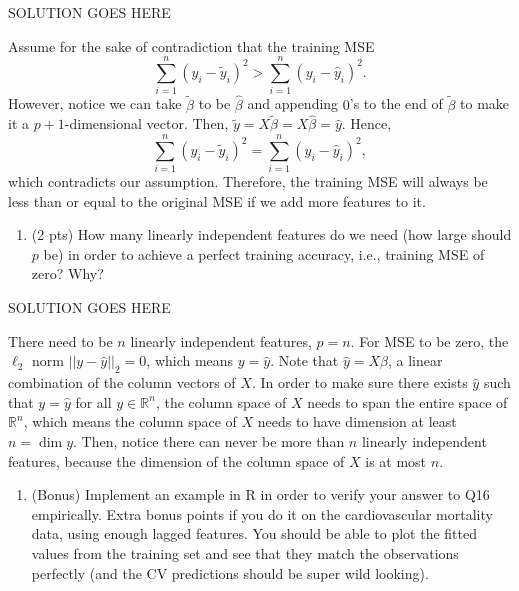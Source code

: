 \documentclass[
]{article}
\providecommand{\tightlist}{%
  \setlength{\itemsep}{0pt}\setlength{\parskip}{0pt}}
\begin{document}
SOLUTION GOES HERE

Assume for the sake of contradiction that the training MSE
\[\sum_{i=1}^n (y_i - \tilde{y}_i)^2 > \sum_{i=1}^n (y_i - \hat{y}_i)^2.\]
However, notice we can take \(\tilde{\beta}\) to be \(\hat{\beta}\) and
appending \(0\)'s to the end of \(\tilde{\beta}\) to make it a
\(p+1\)-dimensional vector. Then,
\(\tilde{y} = X\tilde{\beta} = X\hat{\beta} = \hat{y}\). Hence,
\[\sum_{i=1}^n (y_i - \tilde{y}_i)^2 = \sum_{i=1}^n (y_i - \hat{y}_i)^2,\]
which contradicts our assumption. Therefore, the training MSE will
always be less than or equal to the original MSE if we add more features
to it.

\begin{enumerate}
\def\labelenumi{\arabic{enumi}.}
\setcounter{enumi}{15}
\tightlist
\item
  (2 pts) How many linearly independent features do we need (how large
  should \(p\) be) in order to achieve a perfect training accuracy,
  i.e., training MSE of zero? Why?
\end{enumerate}

SOLUTION GOES HERE

There need to be \(n\) linearly independent features, \(p=n\). For MSE
to be zero, the \(\ell_2\) norm \(||y - \hat{y}||_2 = 0\), which means
\(y = \hat{y}\). Note that \(\hat{y} = X \hat{\beta}\), a linear
combination of the column vectors of \(X\). In order to make sure there
exists \(\hat{y}\) such that \(y = \hat{y}\) for all
\(y\in \mathbb{R}^n\), the column space of \(X\) needs to span the
entire space of \(\mathbb{R}^n\), which means the column space of \(X\)
needs to have dimension at least \(n = \dim y\). Then, notice there can
never be more than \(n\) linearly independent features, because the
dimension of the column space of \(X\) is at most \(n\).

\begin{enumerate}
\def\labelenumi{\arabic{enumi}.}
\setcounter{enumi}{16}
\tightlist
\item
  (Bonus) Implement an example in R in order to verify your answer to
  Q16 empirically. Extra bonus points if you do it on the cardiovascular
  mortality data, using enough lagged features. You should be able to
  plot the fitted values from the training set and see that they match
  the observations perfectly (and the CV predictions should be super
  wild looking).
\end{enumerate}
\end{document}
